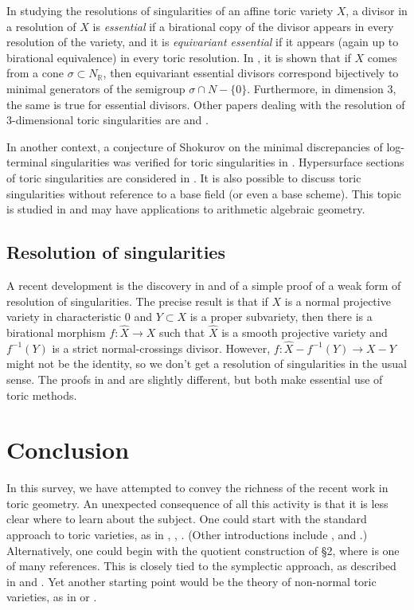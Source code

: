 \documentclass{amsart}
\theoremstyle{plain}
\theoremstyle{definition}
\begin{document}
	In studying the resolutions of singularities of an affine
toric variety $X$, a divisor in a resolution of $X$ is {\it
essential\/} if a birational copy of the divisor appears in every
resolution of the variety, and it is {\it equivariant essential\/} if
it appears (again up to birational equivalence) in every toric
resolution.  In \cite{BG-S}, it is shown that if $X$ comes from a cone
$\sigma \subset N_\mathbb{R}$, then equivariant essential divisors
correspond bijectively to minimal generators of the semigroup
$\sigma\cap N - \{0\}$.  Furthermore, in dimension $3$, the same is
true for essential divisors.  Other papers dealing with the resolution
of $3$-dimensional toric singularities are \cite{ESpa} and \cite{Pou}.

	In another context, a conjecture of Shokurov on the minimal
discrepancies of log-terminal singularities was verified for toric
singularities in \cite{ABor}.  Hypersurface sections of toric
singularities are considered in \cite{Tsu}.  It is also possible to
discuss toric singularities without reference to a base field (or even
a base scheme).  This topic is studied in \cite{Kat} and may have
applications to arithmetic algebraic geometry.

	\subsection{Resolution of singularities} A recent
development is the discovery in \cite{Ad} and \cite{BP} of a simple
proof of a weak form of resolution of singularities.  The precise
result is that if $X$ is a normal projective variety in characteristic
$0$ and $Y\subset X$ is a proper subvariety, then there is a
birational morphism $f : \widehat X \to X$ such that $\widehat X$ is a
smooth projective variety and $f^{-1}(Y)$ is a strict normal-crossings
divisor.  However, $f : \widehat X - f^{-1}(Y) \to X - Y$ might not be
the identity, so we don't get a resolution of singularities in the
usual sense.  The proofs in \cite{Ad} and \cite{BP} are slightly
different, but both make essential use of toric methods.

\section*{Conclusion}

	In this survey, we have attempted to convey the richness of
the recent work in toric geometry.  An unexpected consequence of all
this activity is that it is less clear where to learn about the subject.
One could start with the standard approach to toric varieties, as in
\cite{Dan2}, \cite{Ful}, \cite{Oda2}.  (Other introductions include
\cite{Ewa}, \cite{Oda3} and \cite{Rei4}.)  Alternatively, one could
begin with the quotient construction of \S2, where \cite{Cox2} is one
of many references.  This is closely tied to the symplectic approach,
as described in \cite{Aud} and \cite{Gui}.  Yet another starting point
would be the theory of non-normal toric varieties, as in \cite{GKZ1}
or \cite{Stu2}.
\end{document}
